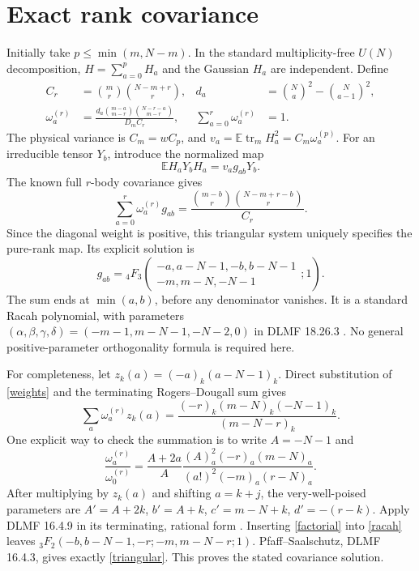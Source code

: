\documentclass[11pt,a4paper]{article}
\newcommand{\tr}{\operatorname{tr}}
\newcommand{\E}{\mathbb E}
\begin{document}
\newpage
\section{Exact rank covariance}
Initially take $p\leq\min(m,N-m)$. In the standard multiplicity-free
$U(N)$ decomposition, $H=\sum_{a=0}^p H_a$ and the Gaussian $H_a$
are independent. Define
\begin{align}
 C_r&=\binom mr\binom{N-m+r}{r},&
 d_a&=\binom Na^2-\binom N{a-1}^2,\\
 \omega_a^{(r)}&=
 \frac{d_a\binom{m-a}{m-r}\binom{N-r-a}{m-r}}{D_m C_r},&
 \sum_{a=0}^r\omega_a^{(r)}&=1.                 \label{weights}
\end{align}
The physical variance is $C_m=wC_p$, and
$v_a=\E\tr_m H_a^2=C_m\omega_a^{(p)}$.
For an irreducible tensor $Y_b$, introduce the normalized map
\begin{equation}
 \E H_aY_bH_a=v_a g_{ab}Y_b.                  \label{map}
\end{equation}
The known full $r$-body covariance gives \cite{kota,tall}
\begin{equation}
 \sum_{a=0}^r\omega_a^{(r)}g_{ab}
 =\frac{\binom{m-b}{r}\binom{N-m+r-b}{r}}{C_r}.
                                                               \label{triangular}
\end{equation}
Since the diagonal weight is positive, this triangular system
uniquely specifies the pure-rank map. Its explicit solution is
\begin{equation}
 \boxed{g_{ab}={}_4F_3\!\left(
 \begin{matrix}-a,a-N-1,-b,b-N-1\\-m,m-N,-N-1\end{matrix};1\right).}
                                                               \label{racah}
\end{equation}
The sum ends at $\min(a,b)$, before any denominator vanishes.
It is a standard Racah polynomial, with parameters
$(\alpha,\beta,\gamma,\delta)=(-m-1,m-N-1,-N-2,0)$
in DLMF 18.26.3 \cite{racah}. No general positive-parameter
orthogonality formula is required here.

For completeness, let $z_k(a)=(-a)_k(a-N-1)_k$. Direct substitution
of \eqref{weights} and the terminating Rogers--Dougall sum gives
\begin{equation}
 \sum_a\omega_a^{(r)}z_k(a)
 =\frac{(-r)_k(m-N)_k(-N-1)_k}{(m-N-r)_k}.       \label{factorial}
\end{equation}
One explicit way to check the summation is to write
$A=-N-1$ and
\[
 \frac{\omega_a^{(r)}}{\omega_0^{(r)}}=
 \frac{A+2a}{A}
 \frac{(A)_a^2(-r)_a(m-N)_a}
 {(a!)^2(-m)_a(r-N)_a}.
\]
After multiplying by $z_k(a)$ and shifting $a=k+j$, the
very-well-poised parameters are
$A'=A+2k$, $b'=A+k$, $c'=m-N+k$, $d'=-(r-k)$.
Apply DLMF 16.4.9 in its terminating, rational form \cite{sums}.
Inserting \eqref{factorial} into \eqref{racah} leaves
${}_3F_2(-b,b-N-1,-r;-m,m-N-r;1)$.
Pfaff--Saalschutz, DLMF 16.4.3, gives exactly
\eqref{triangular}. This proves the stated covariance solution.
\end{document}

